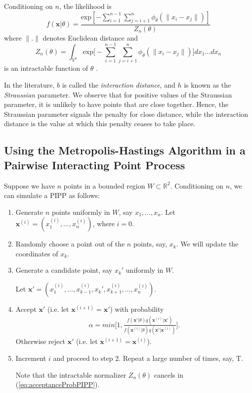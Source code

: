 \documentclass[12pt,openany]{article}
\renewcommand{\vec}[1]{\mathbf{#1}} %
\theoremstyle{remark} %
\theoremstyle{definition} %
\begin{document}
Conditioning on $n$, the likelihood is 
\[
f(\vec{x}|\theta) = \frac{\text{exp}[-\sum_{i=1}^{n-1}\sum_{j=i+1}^{n}\phi_\theta(\| x_i-x_j\|)]}{Z_n(\theta)}
\]
where $\|.\|$ denotes Euclidean distance and 
\[
Z_n(\theta) = \int_{V^n} \text{exp}\bigg[-\sum_{i=1}^{n-1}\sum_{j=i+1}^{n}\phi_\theta(\| x_i-x_j\|)\bigg]dx_1 \ldots dx_n
\]
is an intractable function of $\theta$ \citep{BognarPIPP}.

In the literature, $b$ is called the \textit{interaction distance}, and $h$ is known as the \textit{Straussian} parameter. We observe that for positive values of the Straussian parameter, it is unlikely to have points that are close together. Hence, the Straussian parameter signals the penalty for close distance, while the interaction distance is the value at which this penalty ceases to take place.

\subsection{Using the Metropolis-Hastings Algorithm in a Pairwise Interacting Point Process}

Suppose we have $n$ points in a bounded region $W \subset \mathbb{R}^2$. Conditioning on $n$, we can simulate a PIPP as follows:

\begin{enumerate}
	\item Generate $n$ points uniformly in $W$, say $x_1, \ldots, x_n$. Let $\vec{x}^{(i)} = (x_1^{(i)}, \ldots, x_n^{(i)})$, where $i=0$.
	\item Randomly choose a point out of the $n$ points, say, $x_k$. We will update the coordinates of $x_k$.
	\item Generate a candidate point, say $x_k'$ uniformly in $W$. 
	
	Let $\vec{x}' = (x_1^{(i)}, \ldots, x_{k-1}^{(i)},x_k',x_{k+1}^{(i)}, \ldots, x_n^{(i)}).$
	\item Accept $\vec{x}'$ (i.e. let $\vec{x}^{(i+1)} = \vec{x}'$) with probability
	\begin{align} \label{eq:acceptanceProbPIPP}
	\alpha = min\bigg[1,\frac{f(\vec{x}'|\theta) q(\vec{x}^{(i)}|\vec{x}')}{f(\vec{x}^{(i)}|\theta) q(\vec{x}'|\vec{x}^{(i)})}\bigg].
	\end{align}
Otherwise reject $\vec{x}'$ (i.e. let $\vec{x}^{(i+1)} = \vec{x}^{(i)}$).
	\item Increment $i$ and proceed to step $2$. Repeat a large number of times, say, T.

Note that the intractable normalizer $Z_n(\theta)$ cancels in (\ref{eq:acceptanceProbPIPP}).	
\end{enumerate}
\end{document}
